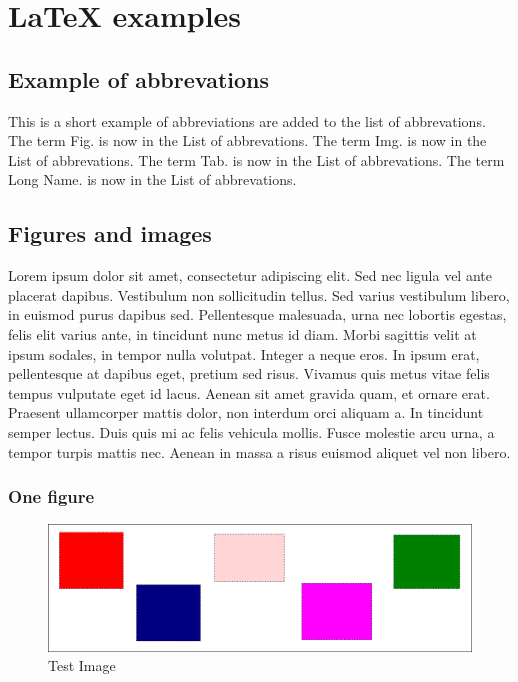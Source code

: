 \chapter{LaTeX examples}

\section{Example of abbrevations}
This is a short example of abbreviations are added to the list of abbrevations.
The term Fig. is now in the List of abbrevations.
The term Img. is now in the List of abbrevations.
The term Tab. is now in the List of abbrevations.
The term Long Name. is now in the List of abbrevations.


\section{Figures and images}
Lorem ipsum dolor sit amet, consectetur adipiscing elit. Sed nec ligula vel
ante placerat dapibus. Vestibulum non sollicitudin tellus. Sed varius
vestibulum libero, in euismod purus dapibus sed. Pellentesque malesuada, urna
nec lobortis egestas, felis elit varius ante, in tincidunt nunc metus id diam.
Morbi sagittis velit at ipsum sodales, in tempor nulla volutpat. Integer a
neque eros. In ipsum erat, pellentesque at dapibus eget, pretium sed risus.
Vivamus quis metus vitae felis tempus vulputate eget id lacus. Aenean sit amet
gravida quam, et ornare erat. Praesent ullamcorper mattis dolor, non interdum
orci aliquam a. In tincidunt semper lectus. Duis quis mi ac felis vehicula
mollis. Fusce molestie arcu urna, a tempor turpis mattis nec. Aenean in massa a
risus euismod aliquet vel non libero.

\subsection{One figure}

\begin{figure}[h]
    \centering
    \includegraphics[width=\textwidth]{figures/test_image}
    \caption{Test Image}
    \label{fig:test_image}
\end{figure}

